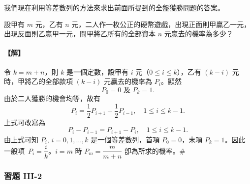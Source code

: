 \vspace{0.8em}
我們現在利用等差數列的方法來求出前面所提到的全盤獲勝問題的答案。

\vspace{1em}
\begin{discussion}\label{disc:b5-3-8}
設甲有 $m$ 元，乙有 $n$ 元，二人作一枚公正的硬幣遊戲，出現正面則甲贏乙一元，出現反面則乙贏甲一元，問甲將乙所有的全部資本 $n$ 元贏去的機率為多少？
\end{discussion}
\paragraph{【解】}
令 $k = m + n$，則 $k$ 是一個定數，設甲有 $i$ 元（$0 \le i \le k$），乙有 $(k - i)$ 元時，甲將乙的全部款項 $(k - i)$ 元贏去的機率為 $P_i$。顯然
\[
P_0 = 0 \text{ 及 } P_k = 1.
\]
由於二人獲勝的機會均等，故有
\[
P_i = \frac{1}{2} P_{i+1} + \frac{1}{2} P_{i-1}, \quad 1 \le i \le k - 1.
\]
上式可改寫為
\[
P_i - P_{i-1} = P_{i+1} - P_i, \quad 1 \le i \le k - 1.
\]
由上式可知 $P_i$, $i = 0, 1, \dots, k$ 是一個等差數列，首項 $P_0 = 0$，末項 $P_k = 1$。因此一般項~$P_i = \dfrac{i}{k}$。$i = m$ 時 $P_m = \dfrac{m}{m+n}$ 卽為所求的機率。\hfill\#

\vspace{1.5em}
\subsubsection*{習題 III-2}\label{sec:b5-ex3-2}

